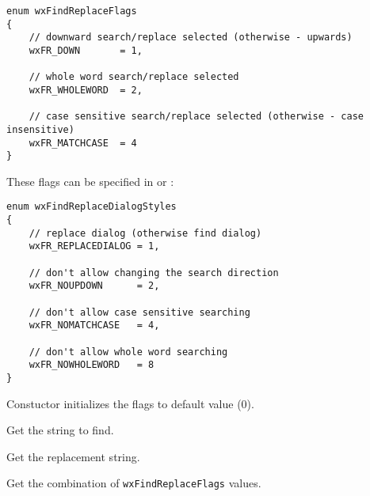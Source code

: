 \begin{verbatim}
enum wxFindReplaceFlags
{
    // downward search/replace selected (otherwise - upwards)
    wxFR_DOWN       = 1,

    // whole word search/replace selected
    wxFR_WHOLEWORD  = 2,

    // case sensitive search/replace selected (otherwise - case insensitive)
    wxFR_MATCHCASE  = 4
}
\end{verbatim}

These flags can be specified in 
 or 
:

\begin{verbatim}
enum wxFindReplaceDialogStyles
{
    // replace dialog (otherwise find dialog)
    wxFR_REPLACEDIALOG = 1,

    // don't allow changing the search direction
    wxFR_NOUPDOWN      = 2,

    // don't allow case sensitive searching
    wxFR_NOMATCHCASE   = 4,

    // don't allow whole word searching
    wxFR_NOWHOLEWORD   = 8
}
\end{verbatim}


\label{wxfindreplacedatactor}


Constuctor initializes the flags to default value ($0$).

\label{wxfindreplacedatagetfindstring}


Get the string to find.

\label{wxfindreplacedatagetreplacestring}


Get the replacement string.

\label{wxfindreplacedatagetflags}


Get the combination of {\tt wxFindReplaceFlags} values.

\label{wxfindreplacedatasetflags}


